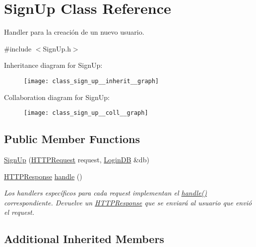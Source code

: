 \hypertarget{class_sign_up}{}\section{Sign\+Up Class Reference}
\label{class_sign_up}


Handler para la creación de un nuevo usuario.  




{\ttfamily \#include $<$Sign\+Up.\+h$>$}



Inheritance diagram for Sign\+Up\+:
\nopagebreak
\begin{figure}[H]
\begin{center}
\leavevmode
\texttt{[image: class\_sign\_up\_\_inherit\_\_graph]}
\end{center}
\end{figure}


Collaboration diagram for Sign\+Up\+:
\nopagebreak
\begin{figure}[H]
\begin{center}
\leavevmode
\texttt{[image: class\_sign\_up\_\_coll\_\_graph]}
\end{center}
\end{figure}
\subsection*{Public Member Functions}
\begin{DoxyCompactItemize}
\item 
\hyperlink{class_sign_up_af454d1ebdbe622c45dbb3efd8fa7179a}{Sign\+Up} (\hyperlink{class_h_t_t_p_request}{H\+T\+T\+P\+Request} request, \hyperlink{class_login_d_b}{Login\+D\+B} \&db)
\item 
\hyperlink{class_h_t_t_p_response}{H\+T\+T\+P\+Response} \hyperlink{class_sign_up_a3d34e2bcdce1556d4a44bb589ed64ddf}{handle} ()
\begin{DoxyCompactList}\small\item\em Los handlers específicos para cada request implementan el \hyperlink{class_sign_up_a3d34e2bcdce1556d4a44bb589ed64ddf}{handle()} correspondiente. Devuelve un \hyperlink{class_h_t_t_p_response}{H\+T\+T\+P\+Response} que se enviará al usuario que envió el request. \end{DoxyCompactList}\end{DoxyCompactItemize}
\subsection*{Additional Inherited Members}


